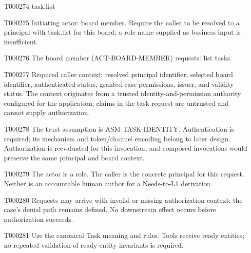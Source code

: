 \documentclass[11pt,a4paper]{article}
\begin{document}
\begin{atlastext}{T000274}
task.list
\end{atlastext}
\begin{atlasparagraph}{T000275}
Initiating actor: board member. Require the caller to be resolved to a principal with task.list for this board; a role name supplied as business input is insufficient.
\end{atlasparagraph}
\begin{atlasparagraph}{T000276}
The board member (ACT-BOARD-MEMBER) requests: list tasks.
\end{atlasparagraph}
\begin{atlasparagraph}{T000277}
Required caller context: resolved principal identifier, selected board identifier, authenticated status, granted case permissions, issuer, and validity status. The context originates from a trusted identity-and-permission authority configured for the application; claims in the task request are untrusted and cannot supply authorization.
\end{atlasparagraph}
\begin{atlasparagraph}{T000278}
The trust assumption is ASM-TASK-IDENTITY. Authentication is required; its mechanism and token/channel encoding belong to later design. Authorization is reevaluated for this invocation, and composed invocations would preserve the same principal and board context.
\end{atlasparagraph}
\begin{atlasparagraph}{T000279}
The actor is a role. The caller is the concrete principal for this request. Neither is an accountable human author for a Needs-to-L1 derivation.
\end{atlasparagraph}
\begin{atlasparagraph}{T000280}
Requests may arrive with invalid or missing authorization context; the case's denial path remains defined. No downstream effect occurs before authorization succeeds.
\end{atlasparagraph}
\begin{atlasparagraph}{T000281}
Use the canonical Task meaning and rules. Tools receive ready entities; no repeated validation of ready entity invariants is required.
\end{atlasparagraph}
\end{document}
